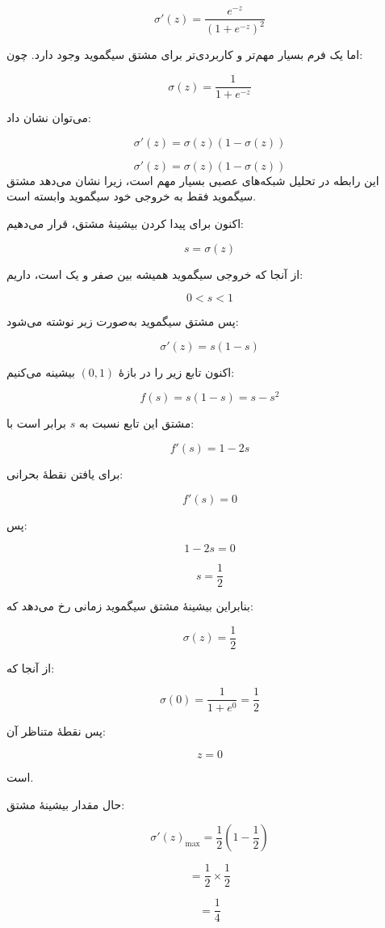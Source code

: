 \documentclass[12pt,a4paper]{article}
\begin{document}
\[
\sigma'(z)
=
\frac{e^{-z}}{(1+e^{-z})^2}
\]

اما یک فرم بسیار مهم‌تر و کاربردی‌تر برای مشتق سیگموید وجود دارد. چون:

\[
\sigma(z)=\frac{1}{1+e^{-z}}
\]

می‌توان نشان داد:

\[
\sigma'(z)=\sigma(z)(1-\sigma(z))
\]

\begin{tcolorbox}[
	colback=softgreen,
	colframe=mygreen,
	title=فرمول مهم مشتق سیگموید
	]
	\[
	\boxed{
		\sigma'(z)=\sigma(z)(1-\sigma(z))
	}
	\]
	این رابطه در تحلیل شبکه‌های عصبی بسیار مهم است، زیرا نشان می‌دهد مشتق سیگموید فقط به خروجی خود سیگموید وابسته است.
\end{tcolorbox}

اکنون برای پیدا کردن بیشینهٔ مشتق، قرار می‌دهیم:

\[
s=\sigma(z)
\]

از آنجا که خروجی سیگموید همیشه بین صفر و یک است، داریم:

\[
0<s<1
\]

پس مشتق سیگموید به‌صورت زیر نوشته می‌شود:

\[
\sigma'(z)=s(1-s)
\]

اکنون تابع زیر را در بازهٔ \((0,1)\) بیشینه می‌کنیم:

\[
f(s)=s(1-s)=s-s^2
\]

مشتق این تابع نسبت به \(s\) برابر است با:

\[
f'(s)=1-2s
\]

برای یافتن نقطهٔ بحرانی:

\[
f'(s)=0
\]

پس:

\[
1-2s=0
\]

\[
s=\frac{1}{2}
\]

بنابراین بیشینهٔ مشتق سیگموید زمانی رخ می‌دهد که:

\[
\sigma(z)=\frac{1}{2}
\]

از آنجا که:

\[
\sigma(0)=\frac{1}{1+e^0}=\frac{1}{2}
\]

پس نقطهٔ متناظر آن:

\[
z=0
\]

است.

حال مقدار بیشینهٔ مشتق:

\[
\sigma'(z)_{\max}
=
\frac{1}{2}
\left(
1-\frac{1}{2}
\right)
\]

\[
=
\frac{1}{2}\times\frac{1}{2}
\]

\[
=
\frac{1}{4}
\]
\end{document}
